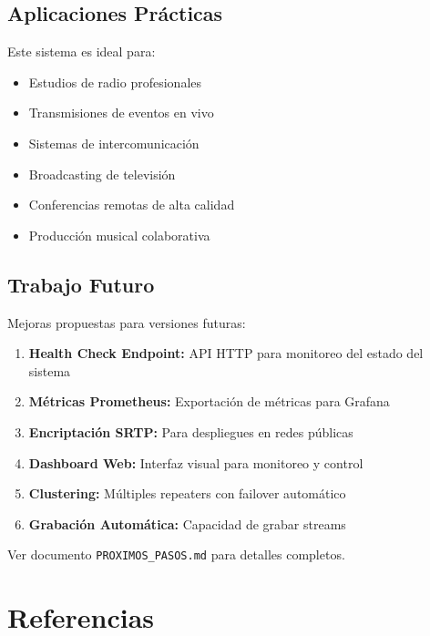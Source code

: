 \documentclass[12pt,a4paper]{article}
\begin{document}
\subsection{Aplicaciones Prácticas}

Este sistema es ideal para:

\begin{itemize}
    \item Estudios de radio profesionales
    \item Transmisiones de eventos en vivo
    \item Sistemas de intercomunicación
    \item Broadcasting de televisión
    \item Conferencias remotas de alta calidad
    \item Producción musical colaborativa
\end{itemize}

\subsection{Trabajo Futuro}

Mejoras propuestas para versiones futuras:

\begin{enumerate}[itemsep=0.5em]
    \item \textbf{Health Check Endpoint:} API HTTP para monitoreo del estado del sistema
    \item \textbf{Métricas Prometheus:} Exportación de métricas para Grafana
    \item \textbf{Encriptación SRTP:} Para despliegues en redes públicas
    \item \textbf{Dashboard Web:} Interfaz visual para monitoreo y control
    \item \textbf{Clustering:} Múltiples repeaters con failover automático
    \item \textbf{Grabación Automática:} Capacidad de grabar streams
\end{enumerate}

Ver documento \texttt{PROXIMOS\_PASOS.md} para detalles completos.

\newpage

\section{Referencias}
\end{document}
